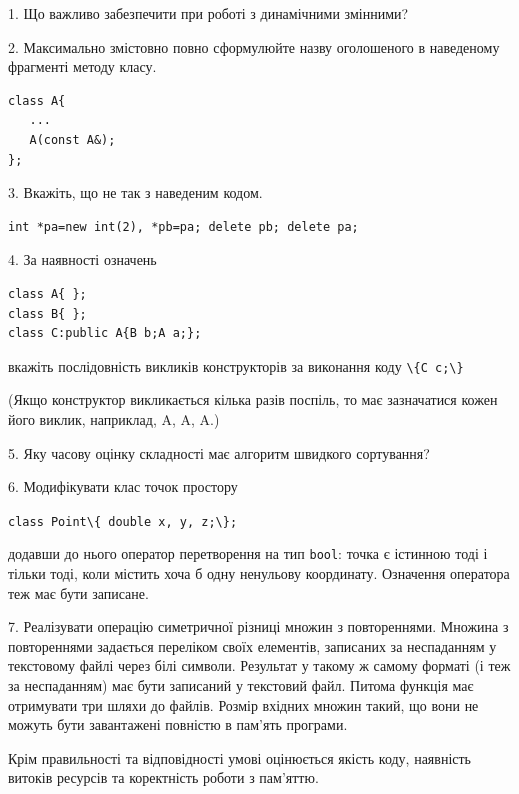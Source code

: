 \documentclass[12pt, ukrainian]{article}
\def\code#1{\Verb!#1!}
\begin{document}
{%
1. Що важливо забезпечити при роботі з динамічними змінними?%
\par
\vspace{2mm}
2. Максимально змістовно повно сформулюйте назву оголошеного в наведеному фрагменті методу класу.
\vspace{-3mm}
\begin{verbatim}class A{
   ...
   A(const A&);
};\end{verbatim}
\vspace{-3mm}
\par
\vspace{2mm}
3. Вкажіть, що не так з наведеним кодом.
\vspace{-3mm}
\begin{verbatim}int *pa=new int(2), *pb=pa; delete pb; delete pa;\end{verbatim}
\vspace{-3mm}
\par
\vspace{2mm}
4. За наявності означень
\vspace{-3mm}
\begin{verbatim}
class A{ };
class B{ };
class C:public A{B b;A a;};\end{verbatim}
\vspace{-3mm}
вкажіть послідовність викликів конструкторів за виконання коду \code{\{C c;\}} 

(Якщо конструктор викликається кілька разів поспіль, то має зазначатися кожен його виклик, наприклад, A, A, A.)

\vspace{2mm}
5. Яку часову оцінку складності має алгоритм швидкого сортування?
\par
\vspace{2mm}
6. Модифікувати клас точок простору 

\qquad\code{class Point\{ double x, y, z;\};}


додавши до нього оператор перетворення на тип \code{bool}: точка є істинною тоді і тільки тоді, коли містить хоча б одну ненульову координату. Означення оператора теж має бути записане.%
\par
\vspace{2mm}
7. 
Реалізувати операцію симетричної різниці множин з повтореннями. Множина з повтореннями задається переліком своїх елементів, записаних за неспаданням у текстовому файлі через білі символи. Результат у такому ж самому форматі (і теж за неспаданням) має бути записаний у текстовий файл. Питома функція має отримувати три шляхи до файлів. Розмір вхідних множин такий, що вони не можуть бути завантажені повністю в пам’ять програми.

Крім правильності та відповідності умові оцінюється якість коду, наявність витоків ресурсів та коректність роботи з пам'яттю. 

}
\end{document}
